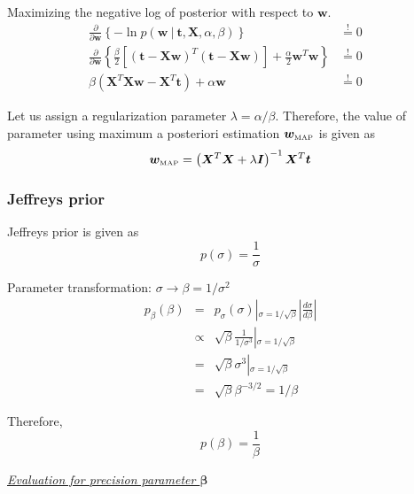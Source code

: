 \documentclass[11pt]{article}
\newcommand{\eye}{\bm{I}}
\newcommand{\map}[1]{{#1}_{\text{\tiny MAP}}}
\newcommand\given[1][]{\:#1\vert\:}
\begin{document}
Maximizing the negative log of posterior with respect to $\bm{w}$.
\begin{eqnarray}
    \frac{\partial }{\partial  \bm{w}} \left\{ -\ln{p(\bm{w} \given \bm{t}, \bm{X}, \alpha, \beta)} \right\} 
    &\overset{!}{=} 0& \\
    \frac{\partial }{\partial \bm{w}} \left\{\frac{\beta}{2} \left[ \left(\bm{t} - \bm{X}\bm{w}\right)^T \left(\bm{t} - \bm{X}\bm{w}\right)\right] + \frac{\alpha}{2}\bm{w}^T\bm{w}\right\}
    &\overset{!}{=} 0& \\
    \beta \left( \bm{X}^T\bm{X}\bm{w} - \bm{X}^T \bm{t} \right) + \alpha\bm{w}
    &\overset{!}{=} 0& 
\end{eqnarray}

Let us assign a regularization parameter $\lambda = \alpha/\beta$. Therefore, the value of parameter using maximum a posteriori estimation $\map{\bm{w}}$ is given as
\begin{equation} \label{eqn:w_map}
    \map{\bm{w}} = \left(\bm{X}^T\bm{X} + \lambda\eye\right)^{-1}\bm{X}^T\bm{t}
\end{equation}

\subsubsection{Jeffreys prior}
Jeffreys prior is given as
\begin{equation}
    p(\sigma) = \frac{1}{\sigma} 
\end{equation}

Parameter transformation: $\sigma\to\beta=1/\sigma^2$
  \begin{eqnarray*}
    p_\beta(\beta) &=& p_\sigma(\sigma)\left|_{\sigma=1/\sqrt{\beta}}\right. \left|\frac{d\sigma}{d\beta} \right| \\
    &\propto& \sqrt{\beta} \frac{1}{1/\sigma^3}\left|_{\sigma=1/\sqrt\beta}\right. \\
    &=& \sqrt{\beta} \sigma^3\left|_{\sigma=1/\sqrt\beta}\right. \\
    &=& \sqrt{\beta} \beta^{-3/2} = 1 / \beta
  \end{eqnarray*}

Therefore,
\begin{equation} \label{eqn:beta_jeffreys}
    p(\beta) = \frac{1}{\beta}
\end{equation}

\vspace{5mm}

\textit{\underline{Evaluation for precision parameter $\bm{\beta}$}}
\end{document}
